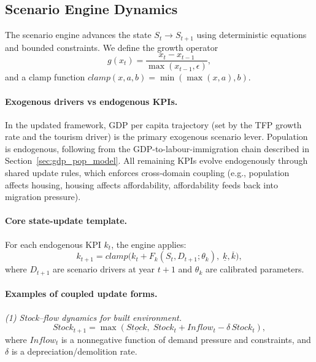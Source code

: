\documentclass{article}
\begin{document}
\subsection{Scenario Engine Dynamics}
\label{subsec:scenario_engine}

The scenario engine advances the state $S_t \rightarrow S_{t+1}$ using
deterministic equations and bounded constraints. We define the growth operator
\begin{equation}
g(x_t)=\frac{x_t-x_{t-1}}{\max(x_{t-1},\epsilon)},
\end{equation}
and a clamp function $clamp(x,a,b)=\min(\max(x,a),b)$.

\paragraph{Exogenous drivers vs endogenous KPIs.}
In the updated framework, GDP per capita trajectory (set by the TFP growth rate
and the tourism driver) is the primary exogenous scenario lever. Population is
endogenous, following from the GDP-to-labour-immigration chain described in
Section~\ref{sec:gdp_pop_model}. All remaining KPIs evolve endogenously through
shared update rules, which enforces cross-domain coupling (e.g., population
affects housing, housing affects affordability, affordability feeds back into
migration pressure).

\paragraph{Core state-update template.}
For each endogenous KPI $k_t$, the engine applies:
\begin{equation}
k_{t+1} = clamp\Big(k_t + F_k(S_t, D_{t+1};\theta_k),\; \underline{k},\overline{k}\Big),
\end{equation}
where $D_{t+1}$ are scenario drivers at year $t{+}1$ and $\theta_k$ are
calibrated parameters.

\paragraph{Examples of coupled update forms.}

\textit{(1) Stock--flow dynamics for built environment.}
\begin{equation}
Stock_{t+1} = \max(\underline{Stock},\; Stock_t + Inflow_t - \delta\,Stock_t),
\end{equation}
where $Inflow_t$ is a nonnegative function of demand pressure and constraints,
and $\delta$ is a depreciation/demolition rate.
\end{document}
